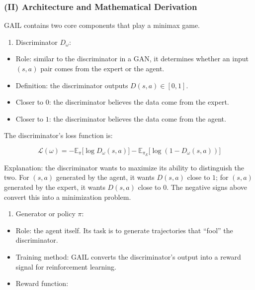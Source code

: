 \hypertarget{ii-architecture-and-mathematical-derivation}{%
\subsubsection{(II) Architecture and Mathematical Derivation}\label{ii-architecture-and-mathematical-derivation}}

GAIL contains two core components that play a minimax game.

\begin{enumerate}
\def\labelenumi{\arabic{enumi}.}
\tightlist
\item
{}
  Discriminator \(D_\omega\):
\end{enumerate}

\begin{itemize}
\tightlist
\item
  Role: similar to the discriminator in a GAN, it determines whether an input \((s,a)\) pair comes from the expert or the agent.
\item
  Definition: the discriminator outputs \(D(s,a)\in[0,1]\).
\item
  Closer to \(0\): the discriminator believes the data come from the expert.
\item
  Closer to \(1\): the discriminator believes the data come from the agent.
\end{itemize}

The discriminator's loss function is:

\[
\mathcal{L}(\omega)
=
-
\mathbb{E}_{\pi}
\bigl[
\log D_\omega(s,a)
\bigr]
-
\mathbb{E}_{\pi_E}
\bigl[
\log(1-D_\omega(s,a))
\bigr]
\]

Explanation: the discriminator wants to maximize its ability to distinguish the two. For \((s,a)\) generated by the agent, it wants \(D(s,a)\) close to \(1\); for \((s,a)\) generated by the expert, it wants \(D(s,a)\) close to \(0\). The negative signs above convert this into a minimization problem.

\begin{enumerate}
\def\labelenumi{\arabic{enumi}.}
\setcounter{enumi}{1}
\tightlist
\item
{}
  Generator or policy \(\pi\):
\end{enumerate}

\begin{itemize}
\tightlist
\item
  Role: the agent itself. Its task is to generate trajectories that ``fool'' the discriminator.
\item
  Training method: GAIL converts the discriminator's output into a reward signal for reinforcement learning.
\item
{}
  Reward function:
\end{itemize}

